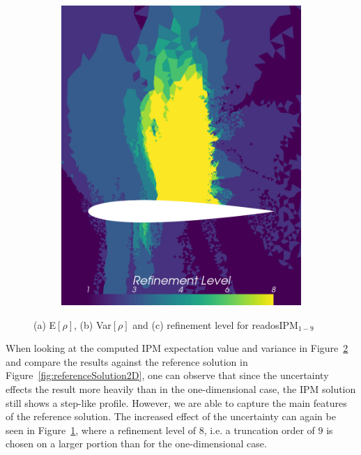 \begin{figure}[h!]
\begin{subfigure}{0.3\linewidth}
		\includegraphics[scale=0.2]{figs/Euler2D/retadosIPM9-4MaP_4_refinementLevel.png}
		\caption{}
		\label{fig:readosIPMEVar2DRefinement}
	\end{subfigure}
	\caption{(a) E$[\rho]$, (b) Var$[\rho]$ and (c) refinement level for readosIPM$_{1-9}$}
	\label{fig:readosIPMEVar2D}
\end{figure}
When looking at the computed IPM expectation value and variance in Figure~\ref{fig:readosIPMEVar2D} and compare the results against the reference solution in Figure~\ref{fig:referenceSolution2D}, one can observe that since the uncertainty effects the result more heavily than in the one-dimensional case, the IPM solution still shows a step-like profile. However, we are able to capture the main features of the reference solution. The increased effect of the uncertainty can again be seen in Figure~\ref{fig:readosIPMEVar2DRefinement}, where a refinement level of $8$, i.e. a truncation order of $9$ is chosen on a larger portion than for the one-dimensional case.

